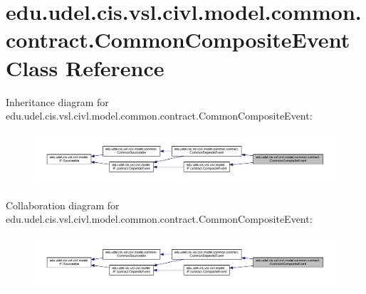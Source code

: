 \hypertarget{classedu_1_1udel_1_1cis_1_1vsl_1_1civl_1_1model_1_1common_1_1contract_1_1CommonCompositeEvent}{}\section{edu.\+udel.\+cis.\+vsl.\+civl.\+model.\+common.\+contract.\+Common\+Composite\+Event Class Reference}
\label{classedu_1_1udel_1_1cis_1_1vsl_1_1civl_1_1model_1_1common_1_1contract_1_1CommonCompositeEvent}


Inheritance diagram for edu.\+udel.\+cis.\+vsl.\+civl.\+model.\+common.\+contract.\+Common\+Composite\+Event\+:
\nopagebreak
\begin{figure}[H]
\begin{center}
\leavevmode
\includegraphics[width=350pt]{classedu_1_1udel_1_1cis_1_1vsl_1_1civl_1_1model_1_1common_1_1contract_1_1CommonCompositeEvent__inherit__graph}
\end{center}
\end{figure}


Collaboration diagram for edu.\+udel.\+cis.\+vsl.\+civl.\+model.\+common.\+contract.\+Common\+Composite\+Event\+:
\nopagebreak
\begin{figure}[H]
\begin{center}
\leavevmode
\includegraphics[width=350pt]{classedu_1_1udel_1_1cis_1_1vsl_1_1civl_1_1model_1_1common_1_1contract_1_1CommonCompositeEvent__coll__graph}
\end{center}
\end{figure}
